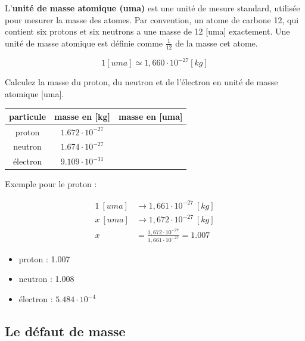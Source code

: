 \documentclass[
  11pt,
  a4paper,
  openany]{book}
\providecommand{\tightlist}{%
  \setlength{\itemsep}{0pt}\setlength{\parskip}{0pt}}
\begin{document}
L'\textbf{unité de masse atomique (uma)} est une unité de mesure standard, utilisée pour mesurer la masse des atomes. Par convention, un atome de carbone 12, qui contient six protons et six neutrons a une masse de 12 {[}uma{]} exactement. Une unité de masse atomique est définie comme \(\frac{1}{12}\) de la masse cet atome.

\[ 1 [uma] \simeq 1,660 \cdot 10^{-27} [kg] \]

\begin{Exercise}
Calculez la masse du proton, du neutron et de l'électron en unité de masse atomique {[}uma{]}.

\end{Exercise}

\begin{longtable}[]{@{}ccc@{}}
\toprule()
particule & masse en {[}kg{]} & masse en {[}uma{]} \\
\midrule()
\endhead
proton & \(1.672\cdot10^{-27}\) & \\
neutron & \(1.674\cdot10^{-27}\) & \\
électron & \(9.109\cdot10^{-31}\) & \\
\bottomrule()
\end{longtable}


\begin{Answer}

Exemple pour le proton :

\[ \begin{split}
  1~[uma] &\rightarrow 1,661\cdot10^{-27}~[kg] \\
  x~[uma] &\rightarrow 1,672\cdot10^{-27}~[kg] \\
  x &= \frac{1,672\cdot10^{-27}}{1,661\cdot10^{-27}} = 1.007
  \end{split} \]

\begin{itemize}
\tightlist
\item
  proton : 1.007
\item
  neutron : 1.008
\item
  électron : \(5.484\cdot10^{-4}\)
\end{itemize}

\end{Answer}

\hypertarget{le-duxe9faut-de-masse}{%
\subsection{Le défaut de masse}\label{le-duxe9faut-de-masse}}
\end{document}
